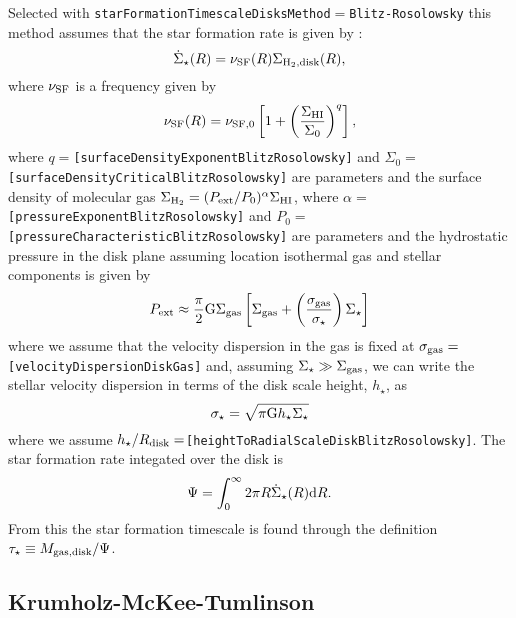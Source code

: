 Selected with {\tt starFormationTimescaleDisksMethod}$=${\tt Blitz-Rosolowsky} this method assumes that the star formation rate is given by \citep{blitz_role_2006}:
\begin{equation}
 \dot{\Sigma}_\star(R) = \nu_{\rm SF}(R) \Sigma_{\rm H_2, disk}(R),
\end{equation}
where $\nu_{\rm SF}$ is a frequency given by
\begin{equation}
 \nu_{\rm SF}(R) = \nu_{\rm SF,0} \left[ 1 + \left({\Sigma_{\rm HI}\over \Sigma_0}\right)^q \right],
\end{equation}
where $q=${\tt [surfaceDensityExponentBlitzRosolowsky]} and $\Sigma_0=${\tt [surfaceDensityCriticalBlitzRosolowsky]} are parameters and the surface density of molecular gas $\Sigma_{\rm H_2} = (P_{\rm ext}/P_0)^\alpha \Sigma_{\rm HI}$, where $\alpha=${\tt [pressureExponentBlitzRosolowsky]} and $P_0=${\tt [pressureCharacteristicBlitzRosolowsky]} are parameters and the hydrostatic pressure in the disk plane assuming location isothermal gas and stellar components is given by
\begin{equation}
 P_{\rm ext} \approx {\pi\over 2} \G \Sigma_{\rm gas} \left[ \Sigma_{\rm gas} + \left({\sigma_{\rm gas}\over \sigma_\star}\right)\Sigma_\star\right]
\end{equation}
where we assume that the velocity dispersion in the gas is fixed at $\sigma_{\rm gas}=${\tt [velocityDispersionDiskGas]} and, assuming $\Sigma_\star \gg \Sigma_{\rm gas}$, we can write the stellar velocity dispersion in terms of the disk scale height, $h_\star$, as
\begin{equation}
 \sigma_\star = \sqrt{\pi \G h_\star \Sigma_\star}
\end{equation}
where we assume $h_\star/R_{\rm disk}=${\tt [heightToRadialScaleDiskBlitzRosolowsky]}. The star formation rate integated over the disk is
\begin{equation}
 \Psi = \int_0^\infty 2 \pi R \dot{\Sigma}_\star(R) \d R.
\end{equation}
From this the star formation timescale is found through the definition $\tau_\star \equiv M_{\rm gas, disk}/\Psi$.

\subsection{Krumholz-McKee-Tumlinson}\label{sec:StarFormationKMT09}

